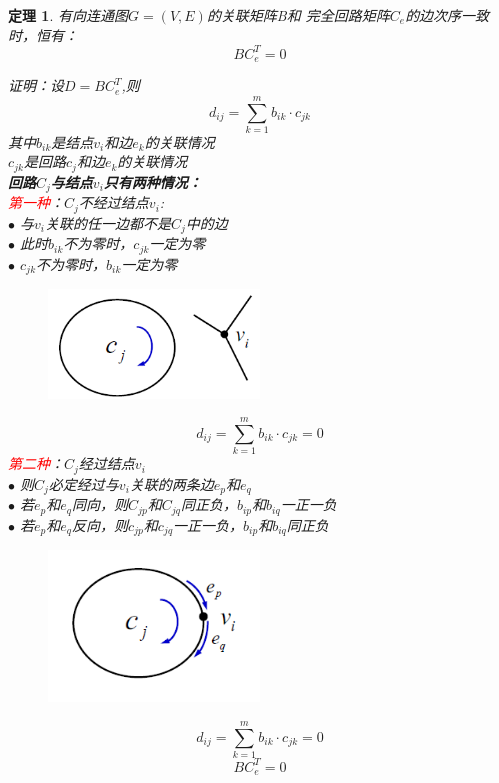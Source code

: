 \documentclass[11pt,a4paper,openany]{book}
\newcommand{\song}{\CJKfamily{song}}
\newtheorem{theorem}{\textbf{定理}}[section]
\begin{document}
\begin{theorem}
有向连通图$G=(V,E)$的关联矩阵B和
完全回路矩阵$C_e$的边次序一致时，恒有：$$BC^T_e=0$$
{\song
证明：设$D=BC^T_e$,则$$d_{ij}=\sum_{k=1}^{m}b_{ik}\cdot c_{jk}$$
其中$b_{ik}$是结点$v_i$和边$e_k$的关联情况\\
$c_{jk}$是回路$c_j$和边$e_k$的关联情况\\
\textbf{回路$C_j$与结点$v_i$只有两种情况：}\\
\textcolor{red}{第一种}：$C_j$不经过结点$v_i$:\\
$\bullet$ 与$v_i$关联的任一边都不是$C_j$中的边\\
$\bullet$ 此时$b_{ik}$不为零时，$c_{jk}$一定为零\\
$ \bullet$ $c_{jk}$不为零时，$b_{ik}$一定为零
\begin{figure}[H]
  \centering
  \includegraphics[width=0.5\textwidth]{f1.png}\\
  \caption*{}
\end{figure}
$$d_{ij}=\sum_{k=1}^{m}b_{ik}\cdot c_{jk}=0$$
\textcolor{red}{第二种}：$C_j$经过结点$v_i$\\
$\bullet$ 则$C_j$必定经过与$v_i$关联的两条边$e_p$和$e_q$\\
$\bullet$ 若$e_p$和$e_q$同向，则$C_{jp}$和$C_{jq}$同正负，$b_{ip}$和$b_{iq}$一正一负\\
$\bullet$ 若$e_p$和$e_q$反向，则$c_{jp}$和$c_{jq}$一正一负，$b_{ip}$和$b_{iq}$同正负
\begin{figure}[H]
  \centering
  \includegraphics[width=0.5\textwidth]{f2.png}\\
  \caption*{}
\end{figure}
$$d_{ij}=\sum_{k=1}^{m}b_{ik}\cdot c_{jk}=0$$
$$BC_{e}^{T}=0$$
}
\end{theorem}
\end{document}
